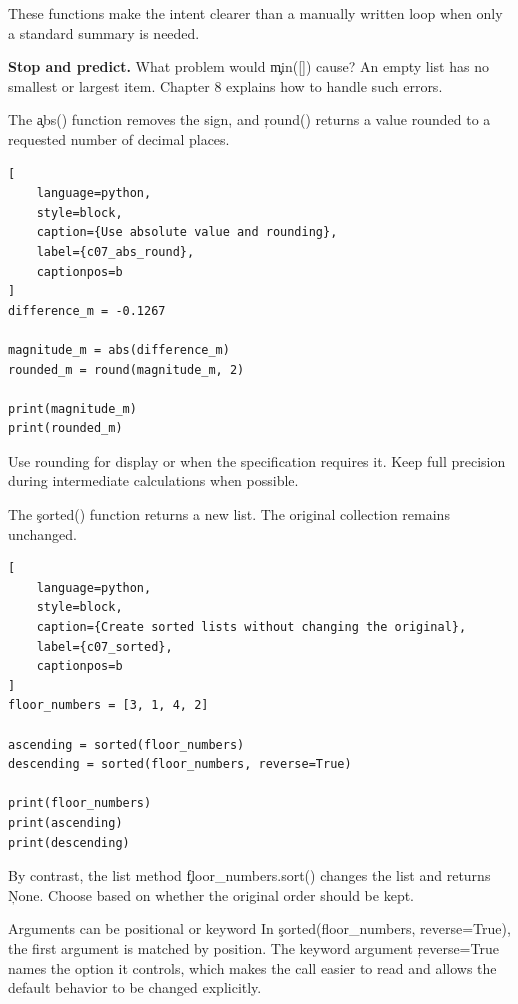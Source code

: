 These functions make the intent clearer than a manually written loop when only
a standard summary is needed.

\begin{NoteBox}
\textbf{Stop and predict.} What problem would \c{min([])} cause? An empty list
has no smallest or largest item. Chapter 8 explains how to handle such errors.
\end{NoteBox}


The \c{abs()} function removes the sign, and \c{round()} returns a value rounded
to a requested number of decimal places.

\begin{lstlisting}[
    language=python,
    style=block,
    caption={Use absolute value and rounding},
    label={c07_abs_round},
    captionpos=b
]
difference_m = -0.1267

magnitude_m = abs(difference_m)
rounded_m = round(magnitude_m, 2)

print(magnitude_m)
print(rounded_m)
\end{lstlisting}

Use rounding for display or when the specification requires it. Keep full
precision during intermediate calculations when possible.


The \c{sorted()} function returns a new list. The original collection remains
unchanged.

\begin{lstlisting}[
    language=python,
    style=block,
    caption={Create sorted lists without changing the original},
    label={c07_sorted},
    captionpos=b
]
floor_numbers = [3, 1, 4, 2]

ascending = sorted(floor_numbers)
descending = sorted(floor_numbers, reverse=True)

print(floor_numbers)
print(ascending)
print(descending)
\end{lstlisting}

By contrast, the list method \c{floor_numbers.sort()} changes the list and
returns \c{None}. Choose based on whether the original order should be kept.

\begin{SyntaxBox}{Arguments can be positional or keyword}
In \c{sorted(floor_numbers, reverse=True)}, the first argument is matched by
position. The keyword argument \c{reverse=True} names the option it controls,
which makes the call easier to read and allows the default behavior to be
changed explicitly.
\end{SyntaxBox}


